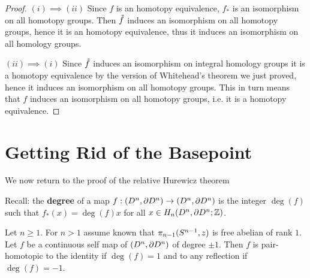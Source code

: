 \begin{proof}
$(i)\implies(ii)$ Since $f$ is an homotopy equivalence, $f_*$ is an isomorphism on all homotopy groups. Then $\tilde{f}$ induces an isomorphism on all homotopy groups, hence it is an homotopy equivalence, thus it induces an isomorphism on all homology groups.

$(ii)\implies(i)$ Since $\tilde{f}$ induces an isomorphism on integral homology groups it is a homotopy equivalence by the version of Whitehead's theorem we just proved, hence it induces an isomorphism on all homotopy groups. This in turn means that $f$ induces an isomorphism on all homotopy groups, i.e. it is a homotopy equivalence.
\end{proof}

\section{Getting Rid of the Basepoint}

We now return to the proof of the relative Hurewicz theorem

Recall: the \textbf{degree} of a map $f:(D^n,\partial D^n)\to(D^n,\partial D^n)$ is the integer $\deg(f)$ such that $f_*(x)=\deg(f)x$ for all $x\in H_n(D^n,\partial D^n;{\mathbb Z})$.

\begin{lemma}\label{lemma:degree-of-sphere-self-maps}
Let $n\geq1$. For $n>1$ assume known that $\pi_{n-1}(S^{n-1},z)$ is free abelian of rank $1$. Let $f$ be a continuous self map of $(D^n,\partial D^n)$ of degree $\pm 1$. Then $f$ is pair-homotopic to the identity if $\deg(f)=1$ and to any reflection if $\deg(f)=-1$.
\end{lemma}

